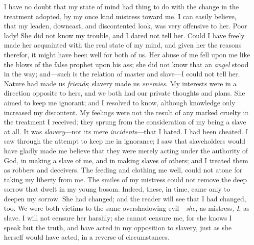I have no doubt that my state of mind had
{\protect\hypertarget{161}{}{}}thing to do with the change in the
treatment adopted, by my once kind mistress toward me. I can easily
believe, that my leaden, downcast, and discontented look, was very
offensive to her. Poor lady! She did not know my trouble, and I dared
not tell her. Could I have freely made her acquainted with the real
state of my mind, and given her the reasons therefor, it might have been
well for both of us. Her abuse of me fell upon me like the blows of the
false prophet upon his ass; she did not know that an \emph{angel} stood
in the way; and---such is the relation of master and slave---I could not
tell her. Nature had made us \emph{friends}; slavery made us
\emph{enemies}. My interests were in a direction opposite to hers, and
we both had our private thoughts and plans. She aimed to keep me
ignorant; and I resolved to know, although knowledge only increased my
discontent. My feelings were not the result of any marked cruelty in the
treatment I received; they sprung from the consideration of my being a
slave at all. It was \emph{slavery}---not its mere
\emph{incidents}---that I hated. I had been cheated. I saw through the
attempt to keep me in ignorance; I saw that slaveholders would have
gladly made me believe that they were merely acting under the authority
of God, in making a slave of me, and in making slaves of others; and I
treated them as robbers and deceivers. The feeding and clothing me well,
could not atone for taking my liberty from me. The smiles of my mistress
could not remove the deep sorrow that dwelt in my young bosom. Indeed,
these, in time, came only to deepen my sorrow. She had changed; and the
reader will see that I had changed, too. We
{\protect\hypertarget{162}{}{}}were both victims to the same
overshadowing evil---\emph{she,} as mistress, \emph{I}, as slave. I will
not censure her harshly; she cannot censure me, for she knows I speak
but the truth, and have acted in my opposition to slavery, just as she
herself would have acted, in a reverse of circumstances.
